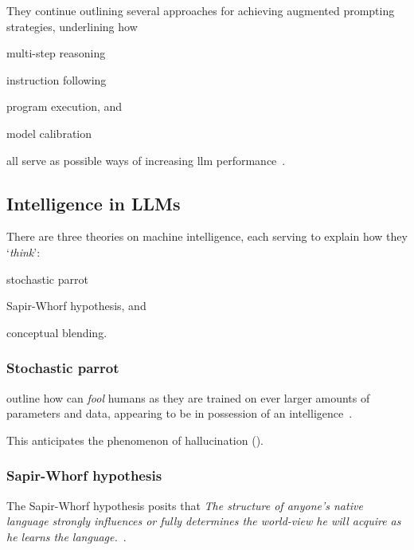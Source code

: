 They continue outlining several approaches for achieving augmented prompting
strategies, underlining how \begin{inparaenum}
    \item multi-step reasoning
    \item instruction following
    \item program execution,
    and
    \item model calibration
\end{inparaenum}
all serve as possible ways of increasing \acrshort{llm} performance~\cite[5]{emergentabilitiesLLM}.


\subsection{Intelligence in LLMs}\label{sec:llmIntelligence}

There are three theories on machine intelligence, each serving to
explain how they `\textit{think}': \begin{inparaenum}
    \item stochastic parrot
    \item Sapir-Whorf hypothesis,
    and
    \item conceptual blending.
\end{inparaenum}

\subsubsection{Stochastic parrot}\label{sec:llmParrot}

\citeauthor{parrot} outline how  can \textit{fool} humans as they
are trained on ever larger amounts of parameters and data, appearing to be in possession of an
intelligence~\cite[610-611]{parrot}.

This anticipates the phenomenon of hallucination ().

\subsubsection{Sapir-Whorf hypothesis}

The Sapir-Whorf hypothesis posits that  \textit{The structure of anyone’s native
    language strongly influences or fully determines the world-view he will acquire
    as he learns the language.}~\cite[128]{sapirWhorf}.

